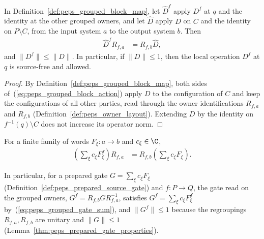 \begin{lemma}
    \label{thm:peps_grouped_block_map}
    \leanok
    In Definition~\ref{def:peps_grouped_block_map}, let $\widehat D^f$ apply
    $D^f$ at $q$ and the identity at the other grouped owners, and let
    $\widehat D$ apply $D$ on $C$ and the identity on $P\setminus C$, from the
    input system $a$ to the output system $b$. Then
    \begin{align}
        \widehat D^fR_{f,a}
         & =R_{f,b}\widehat D,
        \label{eq:peps_grouped_block_action}
    \end{align}
    and $\|D^f\|\le\|D\|$. In particular, if $\|D\|\leq1$, then the local
    operation $D^f$ at $q$ is source-free and allowed.
\end{lemma}

\begin{proof}
    \leanok
    By Definition~\ref{def:peps_grouped_block_map}, both sides
    of~(\ref{eq:peps_grouped_block_action}) apply $D$ to the configuration of
    $C$ and keep the configurations of all other parties, read through the
    owner identifications $R_{f,a}$ and $R_{f,b}$
    (Definition~\ref{def:peps_owner_layout}). Extending $D$ by the identity on
    $f^{-1}(q)\setminus C$ does not increase its operator norm.
\end{proof}

\begin{lemma}
    \label{thm:peps_grouped_gate_sum}
    \leanok
    For a finite family of words $F_\xi:a\to b$ and $c_\xi\in\C$,
    \begin{align}
        \left(\sum_\xi c_\xi F_\xi^f\right)R_{f,a}
         & =R_{f,b}\left(\sum_\xi c_\xi F_\xi\right).
        \label{eq:peps_grouped_gate_sum}
    \end{align}
\end{lemma}

In particular, for a prepared gate $G=\sum_\xi c_\xi F_\xi$
(Definition~\ref{def:peps_prepared_source_gate}) and $f:P\to Q$, the gate read on
the grouped owners, $G^f=R_{f,b}GR_{f,a}^{-1}$, satisfies
$G^f=\sum_\xi c_\xi F_\xi^f$ by~(\ref{eq:peps_grouped_gate_sum}), and
$\|G^f\|\le1$ because the regroupings $R_{f,a},R_{f,b}$ are unitary and
$\|G\|\le1$ (Lemma~\ref{thm:peps_prepared_gate_properties}).

